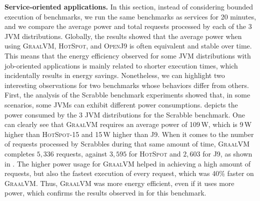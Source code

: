 \vspace{6pt}
\noindent\textbf{Service-oriented applications.}
In this section, instead of considering bounded execution of benchmarks, we run the same benchmarks as services for 20 minutes, and we compare the average power and total requests processed by each of the 3 JVM distributions.
Globally, the results showed that the average power when using \textsc{GraalVM}, \textsc{HotSpot}, and \textsc{OpenJ9} is often equivalent and stable over time.
This means that the energy efficiency observed for some JVM distributions with job-oriented applications is mainly related to shorter execution times, which incidentally results in energy savings.
Nonetheless, we can highlight two interesting observations for two benchmarks whose behaviors differ from others.
First, the analysis of the \textsf{Scrabble} benchmark experiments showed that, in some scenarios, some JVMs can exhibit different power consumptions.
 depicts the power consumed by the 3 JVM distributions for the \textsf{Scrabble} benchmark.
One can clearly see that \textsc{GraalVM} requires an average power of 109\,W, which is 9\,W higher than \textsc{HotSpot-15} and 15\,W higher than \textsc{J9}.
When it comes to the number of requests processed by \textsf{Scrabbles} during that same amount of time, \textsc{GraalVM} completes $5,336$ requests, against $3,595$ for \textsc{HotSpot} and $2,603$ for \textsc{J9}, as shown in .
The higher power usage for \textsc{GraalVM} helped in achieving a high amount of requests, but also the fastest execution of every request, which was 40\% faster on \textsc{GraalVM}.
Thus, \textsc{GraalVM} was more energy efficient, even if it uses more power, which confirms the results observed in  for this benchmark.

